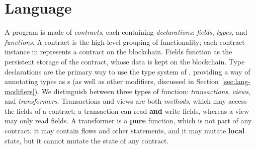 \documentclass[dvipsnames, usenames, sigconf]{acmart}
\begin{document}



\section{Language}\label{sec:lang}
A \langName program is made of \emph{contracts}, each containing \emph{declarations}: \emph{fields}, \emph{types}, and \emph{functions}.
A contract is the high-level grouping of functionality; each contract instance in \langName represents a contract on the blockchain.
Fields function as the persistent storage of the contract, whose data is kept on the blockchain.
Type declarations are the primary way to use the type system of \langName, providing a way of annotating types as \assetTxt{}s (as well as other modifiers, discussed in Section~\ref{sec:lang-modifiers}).
We distinguish between three types of function: \emph{transactions}, \emph{views}, and \emph{transformers}.
Transactions and views are both \emph{methods}, which may access the fields of a contract; a transaction can read \textbf{and} write fields, whereas a view may only read fields.
A transformer is a \textbf{pure} function, which is not part of any contract: it may contain flows and other statements, and it may mutate \textbf{local} state, but it cannot mutate the state of any contract.
\end{document}
